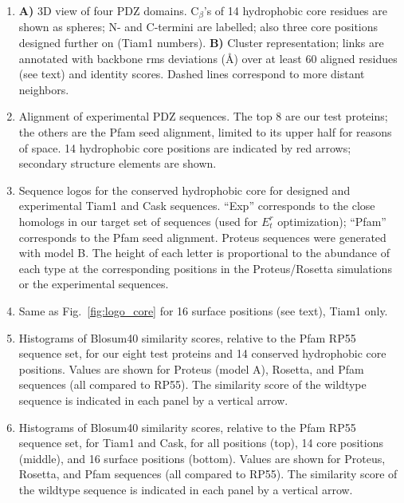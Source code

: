 \documentclass[12pt]{article}
\begin{document}
\begin{enumerate}
\item \label{fig:chain3D} 
{\bf A)} 3D view of four PDZ domains. C$_{\beta}$'s of 14 hydrophobic core residues are shown as spheres; N- and C-termini
are labelled; also three core positions designed further on (Tiam1 numbers).
{\bf B)} Cluster representation; links are annotated with backbone rms deviations (\AA) over at least 60 aligned residues
(see text) and identity scores. Dashed lines correspond to more distant neighbors.

\item \label{fig:align} 
Alignment of experimental PDZ sequences. The top 8 are our test proteins; the others are the Pfam seed alignment, limited
to its upper half for reasons of space. 14 hydrophobic core positions are indicated by red arrows; secondary structure
elements are shown.

\item \label{fig:logo_core}
Sequence logos for the conserved hydrophobic core for designed and experimental Tiam1 and Cask sequences. ``Exp'' corresponds to
the close homologs in our target set of sequences (used for $E_t^r$ optimization); ``Pfam'' corresponds to the Pfam seed alignment.
Proteus sequences were generated with model B. The height of each letter is proportional to the abundance of each type at the
corresponding positions in the Proteus/Rosetta simulations or the experimental sequences.

\item \label{fig:logo_surf}
Same as Fig.\ \ref{fig:logo_core} for 16 surface positions (see text), Tiam1 only.

\item \label{fig:blosumA}
Histograms of Blosum40 similarity scores, relative to the Pfam RP55 sequence set, for our eight test proteins and
14 conserved hydrophobic core positions. Values are shown for Proteus (model A), Rosetta, and Pfam sequences (all
compared to RP55). The similarity score of the wildtype sequence is indicated in each panel by a vertical arrow.

\item \label{fig:blosumB}
Histograms of Blosum40 similarity scores, relative to the Pfam RP55 sequence set, for Tiam1 and Cask, for all positions (top),
14 core positions (middle), and 16 surface positions (bottom). Values are shown for Proteus, Rosetta, and Pfam  sequences (all
compared to RP55). The similarity score of the wildtype sequence is indicated in each panel by a vertical arrow.


\end{enumerate}
\end{document}
